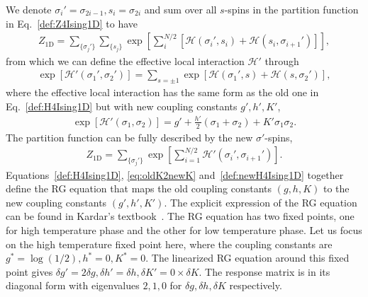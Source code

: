 \documentclass[aps,prb,reprint,superscriptaddress,floatfix]{revtex4-2}
\begin{document}
We denote $\sigma_i'=\sigma_{2i-1}, s_i = \sigma_{2i}$ and sum over all
$s$-spins in the partition function in Eq.~\eqref{def:Z4Ising1D} to have
%
\begin{align}\label{eq:oldK2newKZ}
    Z_{\text{1D}} = \sum_{\{\sigma_j'\}} \sum_{\{s_j \}}
    \exp{\left[ \sum_i^{N/2} \left[\mathscr{H}\left(\sigma_i',s_i\right)
    + \mathscr{H}\left(s_i,\sigma_{i+1}'\right)\right]\right]},
\end{align}
%
from which we can define the effective local interaction $\mathscr{H}'$
through
%
\begin{align}\label{eq:oldK2newK}
    \exp{\left[\mathscr{H}'\left(\sigma_1',\sigma_2'\right)\right]} =
    \sum_{s=\pm 1}\exp{\left[\mathscr{H}\left(\sigma_1',s\right) +
        \mathscr{H}\left(s,\sigma_2'\right)\right]},
\end{align}
%
where the effective local interaction has the same form as the old one
in Eq.~\eqref{def:H4Ising1D} but with new coupling constants $g',h',K'$,
%
\begin{align}\label{def:newH4Ising1D}
    \exp{\left[\mathscr{H}'\left(\sigma_1,\sigma_2\right)\right]} = g' +
    \frac{h'}{2}\left(\sigma_1 + \sigma_2\right) + K' \sigma_1 \sigma_2.
\end{align}
%
The partition function can be fully described by the new $\sigma'$-spins,
%
\begin{align}\label{eq:Z2Ising1Dnew}
    Z_{\text{1D}} = \sum_{\{\sigma_j'\}}
    \exp{\left[\sum_{i=1}^{N/2}\mathscr{H}'\left(\sigma_i',\sigma_{i+1}'\right)\right]}.
\end{align}
%
Equations~\eqref{def:H4Ising1D}, \eqref{eq:oldK2newK}
and~\eqref{def:newH4Ising1D} together define the RG equation that maps
the old coupling constants $(g,h,K)$ to the new coupling constants
$(g',h',K')$. The explicit expression of the RG equation can be found in
Kardar's textbook~\cite{kardar2007}. The RG equation has two fixed
points, one for high temperature phase and the other for low temperature
phase. Let us focus on the high temperature fixed point here, where the
coupling constants are $g^* = \log\left(1/2\right),h^*=0,K^*=0$. The
linearized RG equation around this fixed point gives $\delta g' =
2\delta g, \delta h' = \delta h, \delta K' = 0\times \delta K$. The
response matrix is in its diagonal form with eigenvalues $2,1,0$ for
$\delta g,\delta h,\delta K$ respectively.
%
\end{document}
